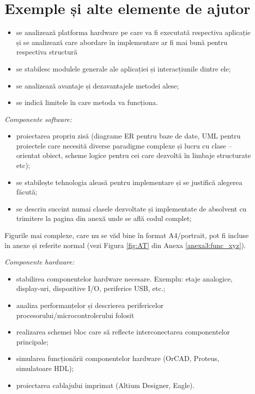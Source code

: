 \section{Exemple și alte elemente de ajutor}

\begin{itemize}
    \item se analizează platforma hardware pe care va fi executată respectiva aplicație și se analizează care abordare în implementare ar fi mai bună pentru respectiva structură
    \item se stabilesc modulele generale ale aplicației și interacțiunile dintre ele;
    \item se analizează avantaje și dezavantajele metodei alese;
    \item se indică limitele în care metoda va funcționa. 
\end{itemize}

\textit{Componente software:}
\begin{itemize}
    \item proiectarea propriu zisă (diagrame ER pentru baze de date, UML pentru proiectele care necesită diverse paradigme complexe și lucru cu clase – orientat obiect, scheme logice pentru cei care dezvoltă în limbaje structurate etc);
    \item se stabilește tehnologia aleasă pentru implementare și se justifică alegerea făcută;
    \item se descriu succint numai clasele dezvoltate și implementate de absolvent cu trimitere la pagina din anexă unde se află codul complet;
\end{itemize}

Figurile mai complexe, care nu se văd bine în format A4/portrait, pot fi incluse în anexe și referite normal (vezi Figura \ref{fig:AT} din Anexa \ref{anexa3:func_xyz}).

\vspace{1em}

\textit{Componente hardware:}
\begin{itemize}
    \item stabilirea componentelor hardware necesare. Exemplu: etaje analogice, display-uri, dispozitive I/O, periferice USB, etc.;
    \item analiza performanțelor și descrierea perifericelor procesorului/microcontrolerului folosit
    \item realizarea schemei bloc care să reflecte interconectarea componentelor principale;
    \item simularea funcționării componentelor hardware (OrCAD, Proteus, simulatoare HDL);
    \item proiectarea cablajului imprimat (Altium Designer, Eagle).
\end{itemize}

